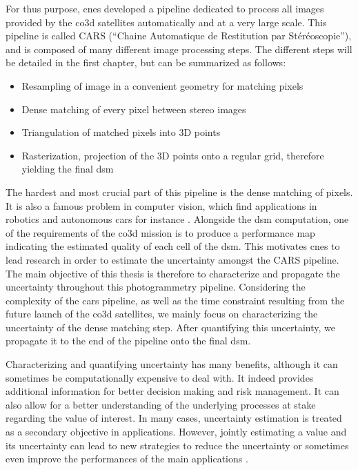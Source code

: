 For thus purpose, \acrshort{cnes} developed a pipeline dedicated to process all images provided by the \acrshort{co3d} satellites automatically and at a very large scale. This pipeline is called CARS (``Chaine Automatique de Restitution par Stéréoscopie''), and is composed of many different image processing steps. The different steps will be detailed in the first chapter, but can be summarized as follows:
\begin{itemize}
    \item Resampling of image in a convenient geometry for matching pixels
    \item Dense matching of every pixel between stereo images
    \item Triangulation of matched pixels into 3D points
    \item Rasterization, \ie projection of the 3D points onto a regular grid, therefore yielding the final \acrshort{dsm} 
\end{itemize}
The hardest and most crucial part of this pipeline is the dense matching of pixels. It is also a famous problem in computer vision, which find applications in robotics and autonomous cars for instance \cite{geiger_vision_2013}. Alongside the \acrshort{dsm} computation, one of the requirements of the \acrshort{co3d} mission is to produce a performance map indicating the estimated quality of each cell of the \acrshort{dsm}. This motivates \acrshort{cnes} to lead research in order to estimate the uncertainty amongst the CARS pipeline. The main objective of this thesis is therefore to characterize and propagate the uncertainty throughout this photogrammetry pipeline. Considering the complexity of the \acrshort{cars} pipeline, as well as the time constraint resulting from the future launch of the \acrshort{co3d} satellites, we mainly focus on characterizing the uncertainty of the dense matching step. After quantifying this uncertainty, we propagate it to the end of the pipeline onto the final \acrshort{dsm}.

Characterizing and quantifying uncertainty has many benefits, although it can sometimes be computationally expensive to deal with. It indeed provides additional information for better decision making and risk management. It can also allow for a better understanding of the underlying processes at stake regarding the value of interest. In many cases, uncertainty estimation is treated as a secondary objective in applications. However, jointly estimating a value and its uncertainty can lead to new strategies to reduce the uncertainty or sometimes even improve the performances of the main applications \cite{chen_learning_2023,jiang_unsupervised_2024}.

